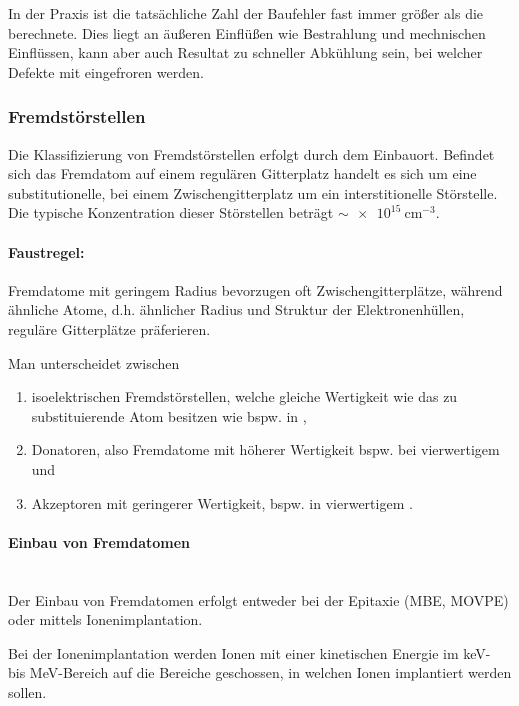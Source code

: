 	In der Praxis ist die tatsächliche Zahl der Baufehler fast immer größer als die berechnete. 
	Dies liegt an äußeren Einflüßen wie Bestrahlung und mechnischen Einflüssen, kann aber auch Resultat zu schneller Abkühlung sein, bei welcher Defekte mit eingefroren werden.

\subsubsection{Fremdstörstellen}
	Die Klassifizierung von Fremdstörstellen erfolgt durch dem Einbauort. Befindet sich das Fremdatom auf einem regulären Gitterplatz handelt es sich um eine substitutionelle, bei einem Zwischengitterplatz um ein interstitionelle Störstelle. Die typische Konzentration dieser Störstellen beträgt $\sim \SI{e15}{\centi \meter ^{-3}}$.
	
	\paragraph{Faustregel:}
	Fremdatome mit geringem Radius bevorzugen oft Zwischengitterplätze, während ähnliche Atome, d.h. ähnlicher Radius und Struktur der Elektronenhüllen, reguläre Gitterplätze präferieren.
	
	Man unterscheidet zwischen
	\begin{enumerate}
		\item isoelektrischen Fremdstörstellen, welche gleiche Wertigkeit wie das zu substituierende Atom besitzen wie bspw.  in ,
		\item Donatoren, also Fremdatome mit höherer Wertigkeit bspw.  bei vierwertigem  und
		\item Akzeptoren mit geringerer Wertigkeit, bspw.  in vierwertigem .
	\end{enumerate}

\paragraph{Einbau von Fremdatomen}\,\\
	Der Einbau von Fremdatomen erfolgt entweder bei der Epitaxie (MBE, MOVPE) oder mittels Ionenimplantation.

	Bei der Ionenimplantation werden Ionen mit einer kinetischen Energie im \unit{\kilo \electronvolt}- bis \unit{\mega \electronvolt}-Bereich auf die Bereiche geschossen, in welchen Ionen implantiert werden sollen. 
	
